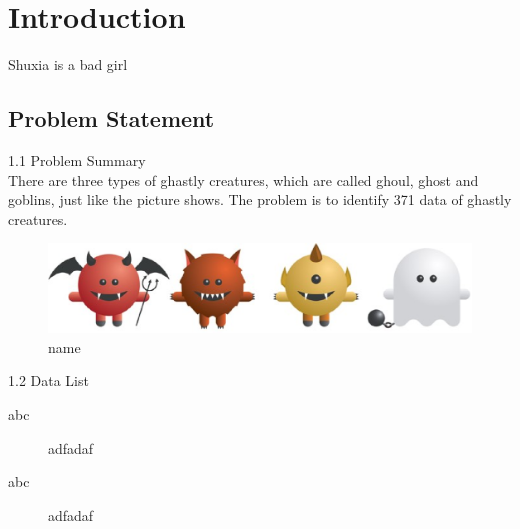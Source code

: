 
\section{Introduction}\label{sec-intro}

Shuxia is a bad girl

\subsection{Problem Statement}

1.1 Problem Summary\\
\hspace*{0.4cm}There are three types of ghastly creatures, which are called ghoul, ghost and goblins, just like the picture shows. The problem is to identify 371 data of ghastly creatures. \\
\begin{figure}[htbp]\centering
	\includegraphics[scale=0.3]{1.eps}
	\caption{name}
\end{figure}


1.2 Data List\\


\begin{description}
	\item[abc] adfadaf
	\item[abc] adfadaf
\end{description}

